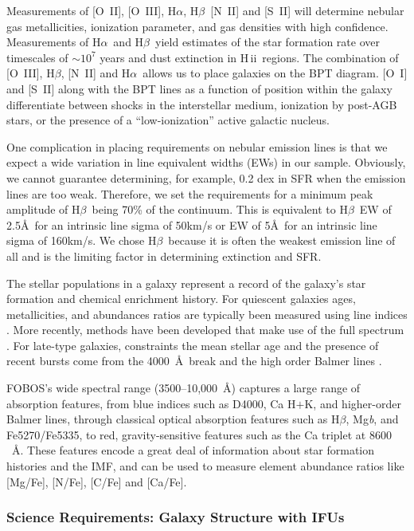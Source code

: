 \documentclass[preprint,11pt]{aastex}
\newcommand{\Halpha}{{H$\alpha$}}
\newcommand{\Hbeta}{{H$\beta$}}
\newcommand{\HII}{{\sc H\,ii}}
\begin{document}
Measurements of [O~II], [O~III], \Halpha, \Hbeta\, [N~II] and [S~II]
will determine nebular gas metallicities, ionization parameter, and
gas densities with high confidence. Measurements of \Halpha\ and
\Hbeta\ yield estimates of the star formation rate over timescales of
$\sim$$10^7$ years and dust extinction in \HII\ regions.  The
combination of [O~III], \Hbeta, [N~II] and \Halpha\ allows us to place
galaxies on the BPT diagram. [O~I] and [S~II] along with the BPT lines
as a function of position within the galaxy differentiate between
shocks in the interstellar medium, ionization by post-AGB stars, or
the presence of a ``low-ionization'' active galactic nucleus.

One complication in placing requirements on nebular emission lines is
that we expect a wide variation in line equivalent widths (EWs) in our
sample. Obviously, we cannot guarantee determining, for example, 0.2
dex in SFR when the emission lines are too weak. Therefore, we set the
requirements for a minimum peak amplitude of \Hbeta\ being 70\% of the
continuum. This is equivalent to \Hbeta\ EW of 2.5\AA\ for an
intrinsic line sigma of 50km/s or EW of 5\AA\ for an intrinsic line
sigma of 160km/s. We chose \Hbeta\ because it is often the weakest
emission line of all and is the limiting factor in determining
extinction and SFR.

The stellar populations in a galaxy represent a record of the galaxy's star formation and chemical enrichment history.   For quiescent galaxies
ages, metallicities, and abundances ratios are typically been measured
using line indices \citep[e.g.][]{johansson12}.  More recently, methods have been developed that make use of the full spectrum \citep{conroy14}.  For late-type galaxies, constraints the mean stellar age and the presence of recent bursts come from the 4000~\AA\ break and the high order Balmer lines \citep[e.g.][]{kauffmann03a}.

FOBOS's wide
spectral range (3500--10,000~\AA) captures a large range of
absorption features, from blue indices such as D4000, Ca H$+$K, and
higher-order Balmer lines, through classical optical absorption
features such as \Hbeta, Mg{\it b}, and Fe5270/Fe5335, to red,
gravity-sensitive features such as the Ca triplet at $8600$~\AA.
These features encode a great deal of information about star formation
histories and the IMF, and can be used to measure element abundance
ratios like [Mg/Fe], [N/Fe], [C/Fe] and [Ca/Fe].

\subsubsection{Science Requirements: Galaxy Structure with IFUs}
\end{document}
